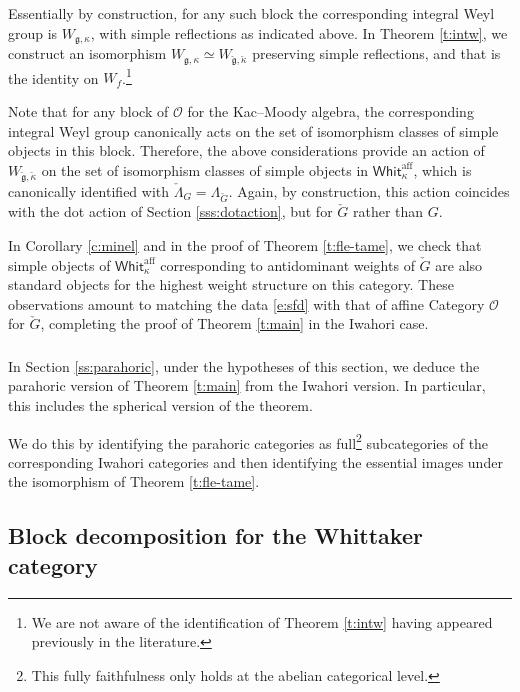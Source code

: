 \documentclass[11pt,reqno]{amsart}
\newcommand{\aff}{\operatorname{aff}}
\newcommand{\fg}{\mathfrak{g}}
\newcommand{\OO}{\mathscr{O}}
\theoremstyle{remark}
\numberwithin{equation}{section}
\newcommand{\Whit}{\mathsf{Whit}}
\begin{document}
Essentially by construction, for any such block the corresponding integral 
Weyl group is $W_{\fg,\kappa}$, with simple
reflections as indicated above. In Theorem \ref{t:intw}, we construct
an isomorphism $W_{\fg,\kappa} \simeq W_{\check{\fg},\check{\kappa}}$
preserving simple reflections, and 
that is the identity on $W_f$.\footnote{We are not aware of the identification
of Theorem \ref{t:intw} having appeared previously in the literature.} 

Note that for any block of $\OO$ for the Kac--Moody algebra, the
corresponding integral Weyl group canonically acts on the set
of isomorphism classes of simple objects in this block. Therefore,
the above considerations provide an action of $W_{\check{\fg},\check{\kappa}}$
on the set of isomorphism classes of simple objects in 
$\Whit_{\kappa}^{\aff}$, which is canonically
identified with $\check{\Lambda}_G = \Lambda_{\check{G}}$. 
Again, by construction, this action coincides with the dot action of
Section \ref{sss:dotaction}, but for $\check{G}$ rather than $G$.


In Corollary \ref{c:minel} and in the proof of 
Theorem \ref{t:fle-tame},
we check that simple objects of 
$\Whit_{\kappa}^{\aff}$ corresponding to
antidominant weights of $\check{G}$ are also standard objects for
the highest weight structure on this category. 
These observations amount to 
matching the data \eqref{e:sfd} with that of affine Category $\OO$ for
$\check{G}$, completing the proof of Theorem \ref{t:main} in
the Iwahori case. 

\subsubsection{}

In Section \ref{ss:parahoric}, under the hypotheses of this
section, we deduce the parahoric version of
Theorem \ref{t:main} from the Iwahori version.
In particular, this includes the spherical version of the theorem. 

We do this by identifying the parahoric categories as full\footnote{This 
fully faithfulness only holds at the abelian categorical level.}
subcategories of the corresponding Iwahori categories and then identifying the
essential images under the isomorphism of Theorem \ref{t:fle-tame}.


\subsection{Block decomposition for the Whittaker category}
\end{document}
